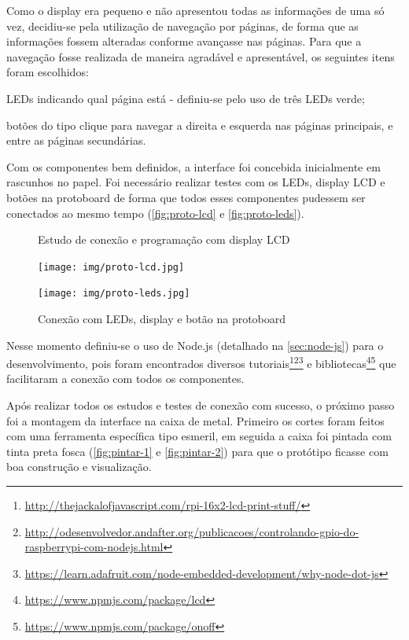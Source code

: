 \documentclass[
		12pt,				%
		openright,			%
		oneside,			%
		a4paper,			%
		chapter=TITLE,		%
		english,			%
		brazil				%
	]{abntex2}
\begin{document}
Como o display era pequeno e não apresentou todas as informações de uma só vez, decidiu-se pela utilização de navegação por páginas, de forma que as informações fossem alteradas conforme avançasse nas páginas. Para que a navegação fosse realizada de maneira agradável e apresentável, os seguintes itens foram escolhidos:

\begin{alineas}
	\item LEDs indicando qual página está - definiu-se pelo uso de três LEDs verde;
	\item botões do tipo clique para navegar a direita e esquerda nas páginas principais, e entre as páginas secundárias.
\end{alineas}

Com os componentes bem definidos, a interface foi concebida inicialmente em rascunhos no papel. Foi necessário realizar testes com os LEDs, display LCD e botões na protoboard de forma que todos esses componentes pudessem ser conectados ao mesmo tempo (\autoref{fig:proto-lcd} e \autoref{fig:proto-leds}). 

\begin{figure}[htb]
	\centering
 	\begin{minipage}{0.47\textwidth}
		\centering
		\caption{\label{fig:proto-lcd}Estudo de conexão e programação com display LCD}
		\texttt{[image: img/proto-lcd.jpg]}
	\end{minipage}
	\hfill
	\begin{minipage}{0.47\textwidth}
		\centering
		\caption{\label{fig:proto-leds}Conexão com LEDs, display e botão na protoboard}
		\texttt{[image: img/proto-leds.jpg]}
	\end{minipage}
\end{figure}

Nesse momento definiu-se o uso de Node.js (detalhado na \autoref{sec:node-js}) para o desenvolvimento, pois foram encontrados diversos tutoriais\footnote{\url{http://thejackalofjavascript.com/rpi-16x2-lcd-print-stuff/}}\footnote{\url{http://odesenvolvedor.andafter.org/publicacoes/controlando-gpio-do-raspberrypi-com-nodejs.html}}\footnote{\url{https://learn.adafruit.com/node-embedded-development/why-node-dot-js}} e bibliotecas\footnote{\url{https://www.npmjs.com/package/lcd}}\footnote{\url{https://www.npmjs.com/package/onoff}} que facilitaram a conexão com todos os componentes.

Após realizar todos os estudos e testes de conexão com sucesso, o próximo passo foi a montagem da interface na caixa de metal. Primeiro os cortes foram feitos com uma ferramenta específica tipo esmeril, em seguida a caixa foi pintada com tinta preta fosca (\autoref{fig:pintar-1} e \autoref{fig:pintar-2}) para que o protótipo ficasse com boa construção e visualização.
\end{document}
